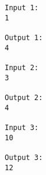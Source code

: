 \begin{verbatim}
Input 1:
1

Output 1:
4

Input 2:
3

Output 2:
4

Input 3:
10

Output 3:
12
\end{verbatim}